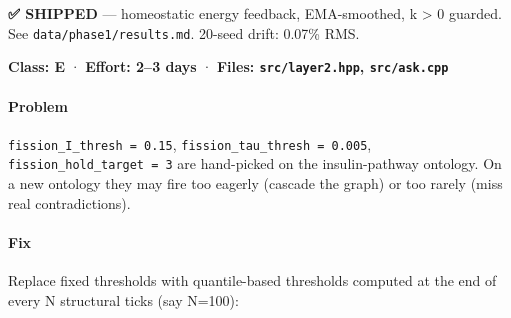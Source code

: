 \documentclass[
  11pt,
  a4paper,
]{article}
\begin{document}
\textbf{✅ SHIPPED} --- homeostatic energy feedback, EMA-smoothed, k
\textgreater{} 0 guarded. See \texttt{data/phase1/results.md}. 20-seed
drift: 0.07\% RMS.

\textbf{Class: E} · \textbf{Effort: 2--3 days} · \textbf{Files:
\texttt{src/layer2.hpp}, \texttt{src/ask.cpp}}

\paragraph{Problem}\label{problem}

\texttt{fission\_I\_thresh\ =\ 0.15},
\texttt{fission\_tau\_thresh\ =\ 0.005},
\texttt{fission\_hold\_target\ =\ 3} are hand-picked on the
insulin-pathway ontology. On a new ontology they may fire too eagerly
(cascade the graph) or too rarely (miss real contradictions).

\paragraph{Fix}\label{fix}

Replace fixed thresholds with quantile-based thresholds computed at the
end of every N structural ticks (say N=100):
\end{document}

